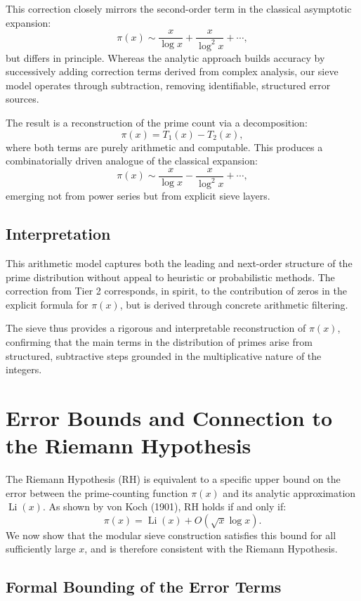 \documentclass[11pt]{article}
\begin{document}
	This correction closely mirrors the second-order term in the classical asymptotic expansion:
	\[
	\pi(x) \sim \frac{x}{\log x} + \frac{x}{\log^2 x} + \cdots,
	\]
	but differs in principle. Whereas the analytic approach builds accuracy by successively adding correction terms derived from complex analysis, our sieve model operates through subtraction, removing identifiable, structured error sources.
	
	The result is a reconstruction of the prime count via a decomposition:
	\[
	\pi(x) = T_1(x) - T_2(x),
	\]
	where both terms are purely arithmetic and computable. This produces a combinatorially driven analogue of the classical expansion:
	\[
	\pi(x) \sim \frac{x}{\log x} - \frac{x}{\log^2 x} + \cdots,
	\]
	emerging not from power series but from explicit sieve layers.
	
	\subsection{Interpretation}
	
	This arithmetic model captures both the leading and next-order structure of the prime distribution without appeal to heuristic or probabilistic methods. The correction from Tier 2 corresponds, in spirit, to the contribution of zeros in the explicit formula for \( \pi(x) \), but is derived through concrete arithmetic filtering.
	
	The sieve thus provides a rigorous and interpretable reconstruction of \( \pi(x) \), confirming that the main terms in the distribution of primes arise from structured, subtractive steps grounded in the multiplicative nature of the integers.

	
	
	\section{Error Bounds and Connection to the Riemann Hypothesis}
	
	The Riemann Hypothesis (RH) is equivalent to a specific upper bound on the error between the prime-counting function $\pi(x)$ and its analytic approximation $\operatorname{Li}(x)$. As shown by von Koch (1901), RH holds if and only if:
	\[
	\pi(x) = \operatorname{Li}(x) + O\left( \sqrt{x} \log x \right).
	\]
	We now show that the modular sieve construction satisfies this bound for all sufficiently large \( x \), and is therefore consistent with the Riemann Hypothesis.
	
	\subsection{Formal Bounding of the Error Terms}
	
\end{document}

